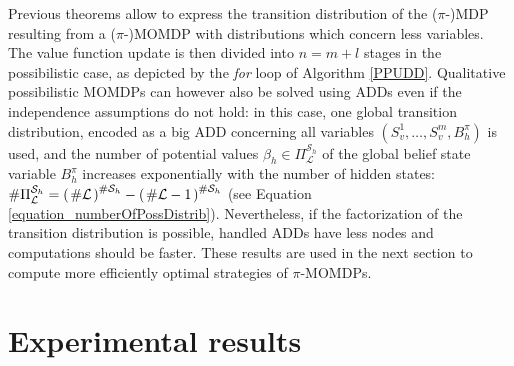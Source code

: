 Previous theorems allow to express the transition distribution
of the ($\pi$-)MDP resulting from a ($\pi$-)MOMDP
with distributions which concern less variables.
The value function update is then divided
into $n=m+l$ stages in the possibilistic case, 
as depicted by the \textit{for} loop of Algorithm \ref{PPUDD}.
Qualitative possibilistic MOMDPs
can however also be solved using ADDs
even if the independence assumptions do not hold:
in this case, one global transition distribution, 
encoded as a big ADD concerning all variables $(S^1_v,\ldots,S^m_v,B^{\pi}_h)$ 
is used, and the number of potential values $\beta_h \in \Pi^{\mathcal{S}_h}_{\mathcal{L}}$
of the global belief state variable $B^{\pi}_h$
increases exponentially with the number of hidden states: 
$\# \Pi^{\mathcal{S}_h}_{\mathcal{L}} = \left( \left. \# \mathcal{L} \right. \right)^{\# \mathcal{S}_h} - \left( \left. \# \mathcal{L} -1 \right. \right)^{\# \mathcal{S}_h}$
(see Equation \ref{equation_numberOfPossDistrib}).
Nevertheless, if the factorization of the transition distribution
is possible,
handled ADDs have less nodes
and computations should be faster.
These results are used in the next section to compute more efficiently
optimal strategies of $\pi$-MOMDPs.

\section{Experimental results}


